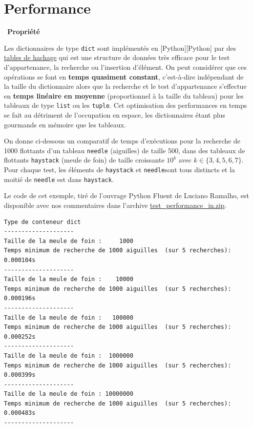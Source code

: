 \documentclass[
  11pt,
]{article}
\newcommand{\passthrough}[1]{#1}
\newcounter{prop}
\newenvironment{propriete}[1]
{\par \medskip   \addtocounter{prop}{1} \noindent  
\begin{bclogo}[arrondi =0.1,  ombre = true, barre=none, logo=\bcbook, marge=4]{~\textbf{Propriété} \textbf{\theprop} {\itshape #1} }   \par}
{
\end{bclogo}
 \par \bigskip }
\begin{document}
\hypertarget{performance}{%
\section{Performance}\label{performance}}

\begin{propriete}{}

Les dictionnaires de type \passthrough{\lstinline!dict!} sont
implémentés en {[}Python{]}{[}Python{]} par des
\href{https://fr.wikipedia.org/wiki/Table_de_hachage}{tables de hachage}
qui est une structure de données très efficace pour le test
d'appartenance, la recherche ou l'insertion d'élément. On peut
considérer que ces opérations se font en \textbf{temps quasiment
constant}, c'est-à-dire indépendant de la taille du dictionnaire alors
que la recherche et le test d'appartenance s'effectue en \textbf{temps
linéaire en moyenne} (proportionnel à la taille du tableau) pour les
tableaux de type \passthrough{\lstinline!list!} ou les
\passthrough{\lstinline!tuple!}. Cet optimisation des performances en
temps se fait au détriment de l'occupation en espace, les dictionnaires
étant plus gourmands en mémoire que les tableaux.

On donne ci-dessous un comparatif de temps d'exécutions pour la
recherche de 1000 flottants d'un tableau
\passthrough{\lstinline!needle!} (aiguilles) de taille 500, dans des
tableaux de flottants \passthrough{\lstinline!haystack!} (meule de foin)
de taille croissante \(10^{k}\) avec \(k \in \{3,4,5,6,7\}\). Pour
chaque test, les éléments de \passthrough{\lstinline!haystack!} et
\passthrough{\lstinline!needle!}sont tous distincts et la moitié de
\passthrough{\lstinline!needle!} est dans
\passthrough{\lstinline!haystack!}.

Le code de cet exemple, tiré de l'ouvrage Python Fluent de Luciano
Ramalho, est disponible avec nos commentaires dans l'archive
\url{test_performance_in.zip}.

\begin{lstlisting}
Type de conteneur dict
--------------------
Taille de la meule de foin :     1000
Temps minimum de recherche de 1000 aiguilles  (sur 5 recherches): 0.000104s
--------------------
Taille de la meule de foin :    10000
Temps minimum de recherche de 1000 aiguilles  (sur 5 recherches): 0.000196s
--------------------
Taille de la meule de foin :   100000
Temps minimum de recherche de 1000 aiguilles  (sur 5 recherches): 0.000252s
--------------------
Taille de la meule de foin :  1000000
Temps minimum de recherche de 1000 aiguilles  (sur 5 recherches): 0.000399s
--------------------
Taille de la meule de foin : 10000000
Temps minimum de recherche de 1000 aiguilles  (sur 5 recherches): 0.000483s
--------------------


\end{lstlisting}
\end{propriete}
\end{document}
